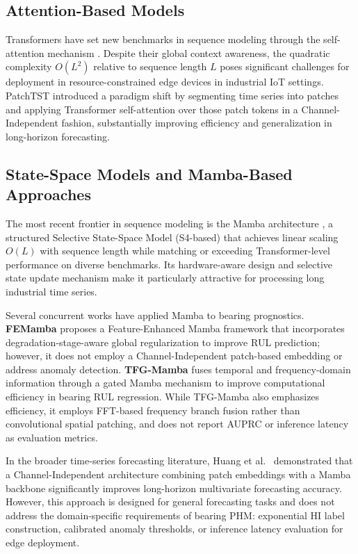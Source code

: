 \documentclass{ieeeaccess}
\begin{document}
{%
\subsection{Attention-Based Models}
Transformers have set new benchmarks in sequence modeling through the self-attention mechanism \cite{vaswani2017attention}. Despite their global context awareness, the quadratic complexity $O(L^2)$ relative to sequence length $L$ poses significant challenges for deployment in resource-constrained edge devices in industrial IoT settings. PatchTST \cite{nie2023patchtst} introduced a paradigm shift by segmenting time series into patches and applying Transformer self-attention over those patch tokens in a Channel-Independent fashion, substantially improving efficiency and generalization in long-horizon forecasting.

\subsection{State-Space Models and Mamba-Based Approaches}
The most recent frontier in sequence modeling is the Mamba architecture \cite{gu2023mamba}, a structured Selective State-Space Model (S4-based) that achieves linear scaling $O(L)$ with sequence length while matching or exceeding Transformer-level performance on diverse benchmarks. Its hardware-aware design and selective state update mechanism make it particularly attractive for processing long industrial time series.

Several concurrent works have applied Mamba to bearing prognostics. \textbf{FEMamba} \cite{feng2025femamba} proposes a Feature-Enhanced Mamba framework that incorporates degradation-stage-aware global regularization to improve RUL prediction; however, it does not employ a Channel-Independent patch-based embedding or address anomaly detection. \textbf{TFG-Mamba} \cite{wei2026tfgmamba} fuses temporal and frequency-domain information through a gated Mamba mechanism to improve computational efficiency in bearing RUL regression. While TFG-Mamba also emphasizes efficiency, it employs FFT-based frequency branch fusion rather than convolutional spatial patching, and does not report AUPRC or inference latency as evaluation metrics.

In the broader time-series forecasting literature, Huang et al.\ \cite{huang2025cipatch} demonstrated that a Channel-Independent architecture combining patch embeddings with a Mamba backbone significantly improves long-horizon multivariate forecasting accuracy. However, this approach is designed for general forecasting tasks and does not address the domain-specific requirements of bearing PHM: exponential HI label construction, calibrated anomaly thresholds, or inference latency evaluation for edge deployment.

}
\end{document}
